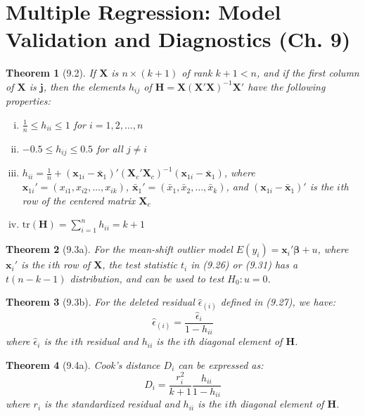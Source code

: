 \documentclass{article}
\newtheorem{theorem}{Theorem}[section]
\begin{document}
\section{Multiple Regression: Model Validation and Diagnostics (Ch. 9)}

\begin{theorem}[9.2]
If $\mathbf{X}$ is $n \times (k+1)$ of rank $k+1 < n$, and if the first column of $\mathbf{X}$ is $\mathbf{j}$, then the elements $h_{ij}$ of $\mathbf{H} = \mathbf{X}(\mathbf{X}'\mathbf{X})^{-1}\mathbf{X}'$ have the following properties:

\begin{enumerate}[(i)]
\item $\frac{1}{n} \leq h_{ii} \leq 1$ for $i = 1,2,\ldots,n$
\item $-0.5 \leq h_{ij} \leq 0.5$ for all $j \neq i$
\item $h_{ii} = \frac{1}{n} + (\mathbf{x}_{1i} - \bar{\mathbf{x}}_1)'(\mathbf{X}_c'\mathbf{X}_c)^{-1}(\mathbf{x}_{1i} - \bar{\mathbf{x}}_1)$, where $\mathbf{x}_{1i}' = (x_{i1}, x_{i2},\ldots,x_{ik})$, $\bar{\mathbf{x}}_1' = (\bar{x}_1, \bar{x}_2,\ldots,\bar{x}_k)$, and $(\mathbf{x}_{1i} - \bar{\mathbf{x}}_1)'$ is the $i$th row of the centered matrix $\mathbf{X}_c$
\item $\text{tr}(\mathbf{H}) = \sum_{i=1}^n h_{ii} = k + 1$
\end{enumerate}
\end{theorem}

\begin{theorem}[9.3a]
For the mean-shift outlier model $E(y_i) = \mathbf{x}_i'\boldsymbol{\beta} + u$, where $\mathbf{x}_i'$ is the $i$th row of $\mathbf{X}$, the test statistic $t_i$ in (9.26) or (9.31) has a $t(n-k-1)$ distribution, and can be used to test $H_0: u = 0$.
\end{theorem}

\begin{theorem}[9.3b]
For the deleted residual $\hat{\epsilon}_{(i)}$ defined in (9.27), we have:
\[\hat{\epsilon}_{(i)} = \frac{\hat{\epsilon}_i}{1-h_{ii}}\]
where $\hat{\epsilon}_i$ is the $i$th residual and $h_{ii}$ is the $i$th diagonal element of $\mathbf{H}$.
\end{theorem}

\begin{theorem}[9.4a] 
Cook's distance $D_i$ can be expressed as:
\[D_i = \frac{r_i^2}{k+1}\frac{h_{ii}}{1-h_{ii}}\]
where $r_i$ is the standardized residual and $h_{ii}$ is the $i$th diagonal element of $\mathbf{H}$.
\end{theorem}
\end{document}
